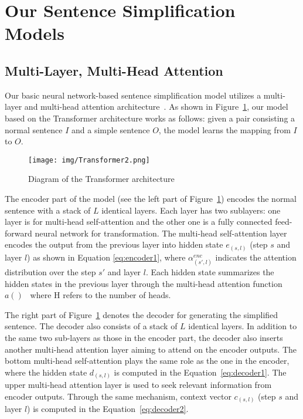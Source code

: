 \documentclass[11pt,a4paper]{article}
\begin{document}
\section{Our Sentence Simplification Models}

\subsection{Multi-Layer, Multi-Head Attention}

Our basic neural network-based sentence simplification model utilizes a multi-layer and multi-head attention architecture~\cite{vaswani2017attention}. 
As shown in Figure~\ref{fig:transformer}, our model based on the Transformer architecture works as follows: given a pair consisting a normal sentence $I$ and a simple sentence $O$, the model learns the mapping from $I$ to $O$. 

\begin{figure}[h]
\begin{center}
   \texttt{[image: img/Transformer2.png]}
\end{center}
\vspace{-0.5em}
   \caption{Diagram of the Transformer architecture}
\label{fig:transformer}
\vspace{-0.5em}
\end{figure}

The encoder part of the model (see the left part of Figure~\ref{fig:transformer}) encodes the normal sentence with a stack of $L$ identical layers. Each layer has two sublayers: one layer is for multi-head self-attention and the other one is a fully connected feed-forward neural network for transformation.
The multi-head self-attention layer encodes the output from the previous layer into hidden state $e_{(s,l)}$ (step $s$ and layer $l$) as shown in Equation \ref{eq:encoder1}, where $\alpha_{(s',l)}^{enc}$ indicates the attention distribution over the step $s'$ and layer $l$.
Each hidden state summarizes the hidden states in the previous layer 
through the multi-head attention function $a()$~\cite{vaswani2017attention} where H refers to the number of heads.

The right part of Figure~\ref{fig:transformer} denotes the decoder for generating the simplified sentence. The decoder also consists of a stack of $L$ identical layers. In addition to the same two sub-layers as those in the encoder part, the decoder also inserts another multi-head attention layer aiming to attend on the encoder outputs. The bottom multi-head self-attention plays the same role as the one in the encoder, where the hidden state $d_{(s,l)}$ is computed in the Equation~\ref{eq:decoder1}. The upper multi-head attention layer is used to seek relevant information from encoder outputs. Through the same mechanism, context vector $c_{(s,l)}$ (step $s$ and layer $l$) is computed in the Equation~\ref{eq:decoder2}.
\end{document}
